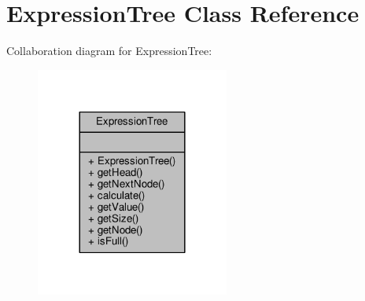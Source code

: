 \hypertarget{classExpressionTree}{}\section{Expression\+Tree Class Reference}
\label{classExpressionTree}


Collaboration diagram for Expression\+Tree\+:
\nopagebreak
\begin{figure}[H]
\begin{center}
\leavevmode
\includegraphics[width=180pt]{classExpressionTree__coll__graph}
\end{center}
\end{figure}

